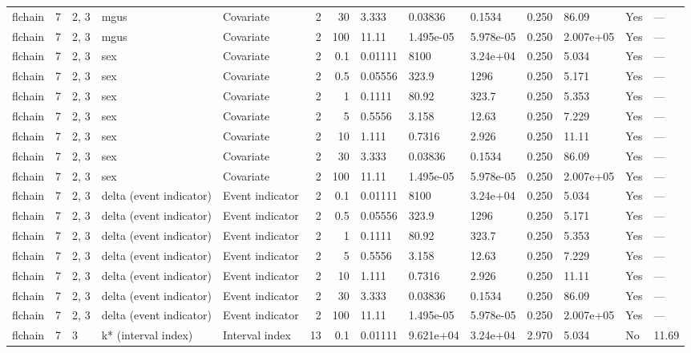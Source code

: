 \begin{tabular}{lrlllrrlllllll}
  flchain & 7 & 2, 3 & mgus & Covariate & 2 &    30 & 3.333 & 0.03836 & 0.1534 & 0.250 & 86.09 & Yes & --- \\ 
  flchain & 7 & 2, 3 & mgus & Covariate & 2 &   100 & 11.11 & 1.495e-05 & 5.978e-05 & 0.250 & 2.007e+05 & Yes & --- \\ 
  flchain & 7 & 2, 3 & sex & Covariate & 2 &   0.1 & 0.01111 & 8100 & 3.24e+04 & 0.250 & 5.034 & Yes & --- \\ 
  flchain & 7 & 2, 3 & sex & Covariate & 2 &   0.5 & 0.05556 & 323.9 & 1296 & 0.250 & 5.171 & Yes & --- \\ 
  flchain & 7 & 2, 3 & sex & Covariate & 2 &     1 & 0.1111 & 80.92 & 323.7 & 0.250 & 5.353 & Yes & --- \\ 
  flchain & 7 & 2, 3 & sex & Covariate & 2 &     5 & 0.5556 & 3.158 & 12.63 & 0.250 & 7.229 & Yes & --- \\ 
  flchain & 7 & 2, 3 & sex & Covariate & 2 &    10 & 1.111 & 0.7316 & 2.926 & 0.250 & 11.11 & Yes & --- \\ 
  flchain & 7 & 2, 3 & sex & Covariate & 2 &    30 & 3.333 & 0.03836 & 0.1534 & 0.250 & 86.09 & Yes & --- \\ 
  flchain & 7 & 2, 3 & sex & Covariate & 2 &   100 & 11.11 & 1.495e-05 & 5.978e-05 & 0.250 & 2.007e+05 & Yes & --- \\ 
  flchain & 7 & 2, 3 & delta (event indicator) & Event indicator & 2 &   0.1 & 0.01111 & 8100 & 3.24e+04 & 0.250 & 5.034 & Yes & --- \\ 
  flchain & 7 & 2, 3 & delta (event indicator) & Event indicator & 2 &   0.5 & 0.05556 & 323.9 & 1296 & 0.250 & 5.171 & Yes & --- \\ 
  flchain & 7 & 2, 3 & delta (event indicator) & Event indicator & 2 &     1 & 0.1111 & 80.92 & 323.7 & 0.250 & 5.353 & Yes & --- \\ 
  flchain & 7 & 2, 3 & delta (event indicator) & Event indicator & 2 &     5 & 0.5556 & 3.158 & 12.63 & 0.250 & 7.229 & Yes & --- \\ 
  flchain & 7 & 2, 3 & delta (event indicator) & Event indicator & 2 &    10 & 1.111 & 0.7316 & 2.926 & 0.250 & 11.11 & Yes & --- \\ 
  flchain & 7 & 2, 3 & delta (event indicator) & Event indicator & 2 &    30 & 3.333 & 0.03836 & 0.1534 & 0.250 & 86.09 & Yes & --- \\ 
  flchain & 7 & 2, 3 & delta (event indicator) & Event indicator & 2 &   100 & 11.11 & 1.495e-05 & 5.978e-05 & 0.250 & 2.007e+05 & Yes & --- \\ 
  flchain & 7 & 3 & k* (interval index) & Interval index & 13 &   0.1 & 0.01111 & 9.621e+04 & 3.24e+04 & 2.970 & 5.034 & No & 11.69 \\ 

\end{tabular}
